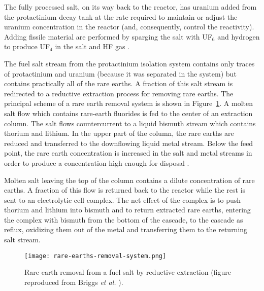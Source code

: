The fully processed salt, on its way back to the reactor, has uranium added from the protactinium decay tank at the rate required to maintain or adjust the uranium concentration in the reactor (and, consequently, control the reactivity). Adding fissile material are performed by sparging the salt with UF$_6$ and hydrogen to produce UF$_4$ in the salt and HF gas \cite{robertson_conceptual_1971}.

The fuel salt stream from the protactinium isolation system contains only traces of protactinium and uranium (because it was separated in the system) but contains practically all of the rare earths. A fraction of this salt stream is redirected to a reductive extraction process for removing rare earths.  The principal scheme of a rare earth removal system is shown in Figure~\ref{fig:rare-earth-removal}. A molten salt flow which contains rare-earth fluorides is fed to the center of an extraction column. The salt flows countercurrent to a liquid bismuth stream which contains thorium and lithium. In the upper part of the column, the rare earths are reduced and transferred to the downflowing liquid metal stream. Below the feed point, the rare earth concentration is increased in the salt and metal streams in order to produce a concentration high enough for disposal \cite{briggs_molten-salt_1969}.

Molten salt leaving the top of the column contains a dilute concentration of rare earths. A fraction of this flow is returned back to the reactor while the rest is sent to an electrolytic cell complex. The net effect of the complex is to push thorium and lithium into bismuth and to return extracted rare earths, entering the complex with bismuth from the bottom of the cascade, to the cascade as reflux, oxidizing them out of the metal and transferring them to the returning salt stream.
\begin{figure}[htbp!]
  \centering
        \texttt{[image: rare-earths-removal-system.png]}
    \caption{Rare earth removal from a fuel salt by reductive extraction (figure 
    reproduced from Briggs \emph{et al.} \cite{briggs_molten-salt_1969}).}
    \label{fig:rare-earth-removal}
\end{figure}

